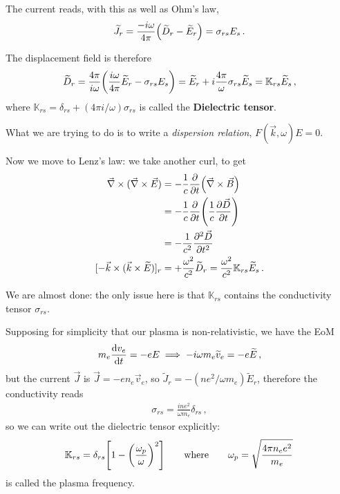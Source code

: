 \documentclass[main.tex]{subfiles}
\begin{document}
The current reads, with this as well as Ohm's law,
%
\begin{align}
\widetilde{J} _r = \frac{- i \omega }{4 \pi } \qty(\widetilde{D}_r - \widetilde{E}_r) = \sigma_{rs} E_s
\,.
\end{align}

The displacement field is therefore 
%
\begin{align}
\widetilde{D}_r
= \frac{4 \pi }{ i \omega } \qty(\frac{i \omega }{ 4 \pi } \widetilde{E}_r - \sigma_{rs} E_s) = \widetilde{E}_r
+ i \frac{4 \pi }{\omega } \sigma_{rs} \widetilde{E}_s 
= \mathbb{K}_{rs} \widetilde{E}_s
\,,
\end{align}
%
where \(\mathbb{K}_{rs} = \delta_{rs} + (4 \pi i / \omega ) \sigma_{rs}\) is called the \textbf{Dielectric tensor}.

What we are trying to do is to write a \emph{dispersion relation}, \(F(\vec{k}, \omega ) E = 0\). 

Now we move to Lenz's law: we take another curl, to get 
%
\begin{subequations}
\begin{align}
\vec{\nabla} \times (\vec{\nabla} \times \vec{E}) &= - \frac{1}{c} \pdv{}{t} \qty(\vec{\nabla} \times \vec{B})   \\
&= - \frac{1}{c} \pdv{}{t} \qty( \frac{1}{c}\pdv{\vec{D}}{t})  \\
&= - \frac{1}{c^2} \pdv[2]{\vec{D}}{t}  \\
[- \vec{k} \times (\vec{k} \times \widetilde{E})]_r &= + \frac{\omega^2}{c^2} \widetilde{D}_r = \frac{\omega^2}{c^2} \mathbb{K}_{rs} \widetilde{E}_s
\,.
\end{align}
\end{subequations}

We are almost done: the only issue here is that \(\mathbb{K}_{rs}\) contains the conductivity tensor \(\sigma_{rs}\). 

Supposing for simplicity  that our plasma is non-relativistic, we have the EoM 
%
\begin{align}
m_e \dv{v_e}{t} = - e E \implies 
- i \omega m_e \widetilde{v}_e = - e \widetilde{E}
\,,
\end{align}
%
but the current \(\vec{J}\) is \(\vec{J} = - e n_e \vec{v}_e\), so \(\widetilde{J}_r = - (n e^2 / \omega m_e) \widetilde{E}_r\), therefore the conductivity reads 
%
\begin{align}
\sigma_{rs} = \frac{i n e^2}{\omega m_e} \delta_{rs} 
\,,
\end{align}
%
so we can write out the dielectric tensor explicitly: 
%
\begin{align}
\mathbb{K}_{rs} = \delta_{rs} \qty[ 1 - \qty(\frac{\omega_p}{\omega })^2]
\qquad \text{where} \qquad
\omega_p = \sqrt{\frac{ 4 \pi n_e e^2}{m_e}}
\,
\end{align}
%
is called the plasma frequency.
\end{document}
